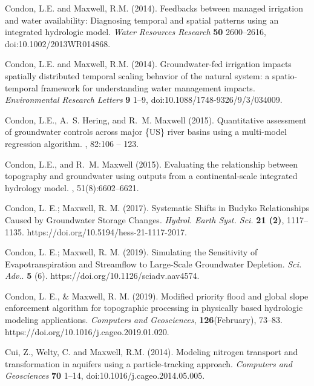 \begin{thebibliography}{999}
Condon, L.E. and Maxwell, R.M. (2014). Feedbacks between managed irrigation and water availability: Diagnosing temporal and spatial patterns using an integrated hydrologic model. {\em Water Resources Research} {\bf 50} 2600--2616, doi:10.1002/2013WR014868.

Condon, L.E. and Maxwell, R.M. (2014). Groundwater-fed irrigation impacts spatially distributed temporal scaling behavior of the natural system: a spatio-temporal framework for understanding water management impacts. {\em Environmental Research Letters} {\bf 9} 1--9, doi:10.1088/1748-9326/9/3/034009.

 Condon, L.E., A.~S. Hering, and R.~M. Maxwell (2015).
\newblock Quantitative assessment of groundwater controls across major \{US\}
  river basins using a multi-model regression algorithm.
, 82:106 -- 123.

Condon, L.E., and R.~M. Maxwell (2015).
\newblock Evaluating the relationship between topography and groundwater using
  outputs from a continental-scale integrated hydrology model.
, 51(8):6602--6621.


Condon, L. E.; Maxwell, R. M. (2017). Systematic Shifts in Budyko Relationships Caused by Groundwater Storage Changes. {\em Hydrol. Earth Syst. Sci.} {\bf 21 (2)}, 1117–1135. https://doi.org/10.5194/hess-21-1117-2017.


Condon, L. E.; Maxwell, R. M. (2019). Simulating the Sensitivity of Evapotranspiration and Streamflow to Large-Scale Groundwater Depletion. {\em Sci. Adv.}. {\bf 5} (6). https://doi.org/10.1126/sciadv.aav4574.

Condon, L. E., & Maxwell, R. M. (2019). Modified priority flood and global slope enforcement algorithm for topographic processing in physically based hydrologic modeling applications. {\em Computers and Geosciences}, {\bf 126}(February), 73–83. https://doi.org/10.1016/j.cageo.2019.01.020.



Cui, Z., Welty, C. and Maxwell, R.M. (2014). 
\newblock Modeling nitrogen transport and transformation in aquifers using a particle-tracking approach. {\em Computers and Geosciences} {\bf 70} 1--14, doi:10.1016/j.cageo.2014.05.005.


\end{thebibliography}
